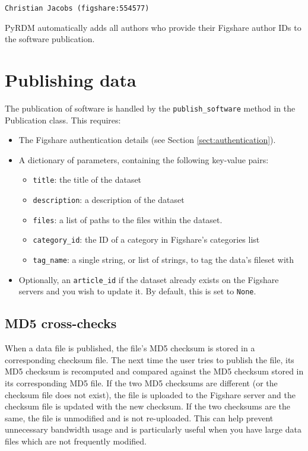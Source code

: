 \documentclass[a4paper,11pt]{report}
\begin{document}
\texttt{Christian Jacobs (figshare:554577)}

PyRDM automatically adds all authors who provide their Figshare author IDs to the software publication.

\section{Publishing data}
The publication of software is handled by the \texttt{publish\_software} method in the Publication class. This requires:

\begin{itemize}
  \item The Figshare authentication details (see Section \ref{sect:authentication}).
  \item A dictionary of parameters, containing the following key-value pairs:
    \begin{itemize}
      \item \texttt{title}: the title of the dataset
      \item \texttt{description}: a description of the dataset
      \item \texttt{files}: a list of paths to the files within the dataset.
      \item \texttt{category\_id}: the ID of a category in Figshare's categories list
      \item \texttt{tag\_name}: a single string, or list of strings, to tag the data's fileset with
    \end{itemize}
  \item Optionally, an \texttt{article\_id} if the dataset already exists on the Figshare servers and you wish to update it. By default, this is set to \texttt{None}.
\end{itemize}

\subsection{MD5 cross-checks}
When a data file is published, the file's MD5 checksum is stored in a corresponding checksum file. The next time the user tries to publish the file, its MD5 checksum is recomputed and compared against the MD5 checksum stored in its corresponding MD5 file. If the two MD5 checksums are different (or the checksum file does not exist), the file is uploaded to the Figshare server and the checksum file is updated with the new checksum. If the two checksums are the same, the file is unmodified and is not re-uploaded. This can help prevent unnecessary bandwidth usage and is particularly useful when you have large data files which are not frequently modified.
\end{document}
